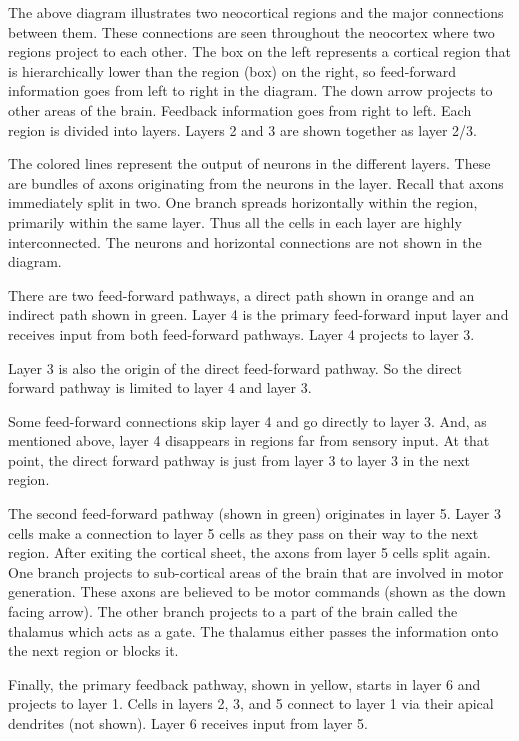 \documentclass{report}
\begin{document}
The above diagram illustrates two neocortical regions and the major
connections between them. These connections are seen throughout the
neocortex where two regions project to each other. The box on the left
represents a cortical region that is hierarchically lower than the
region (box) on the right, so feed-forward information goes from left
to right in the diagram. The down arrow projects to other areas of the
brain. Feedback information goes from right to left. Each region is
divided into layers. Layers 2 and 3 are shown together as layer 2/3.

The colored lines represent the output of neurons in the different
layers. These are bundles of axons originating from the neurons in the
layer. Recall that axons immediately split in two. One branch spreads
horizontally within the region, primarily within the same layer. Thus
all the cells in each layer are highly interconnected. The neurons and
horizontal connections are not shown in the diagram.

There are two feed-forward pathways, a direct path shown in orange and
an indirect path shown in green. Layer 4 is the primary feed-forward
input layer and receives input from both feed-forward pathways. Layer
4 projects to layer 3.

Layer 3 is also the origin of the direct feed-forward pathway. So the
direct forward pathway is limited to layer 4 and layer 3.

Some feed-forward connections skip layer 4 and go directly to layer
3. And, as mentioned above, layer 4 disappears in regions far from
sensory input. At that point, the direct forward pathway is just from
layer 3 to layer 3 in the next region.

The second feed-forward pathway (shown in green) originates in layer
5. Layer 3 cells make a connection to layer 5 cells as they pass on
their way to the next region. After exiting the cortical sheet, the
axons from layer 5 cells split again. One branch projects to
sub-cortical areas of the brain that are involved in motor
generation. These axons are believed to be motor commands (shown as
the down facing arrow). The other branch projects to a part of the
brain called the thalamus which acts as a gate. The thalamus either
passes the information onto the next region or blocks it.

Finally, the primary feedback pathway, shown in yellow, starts in
layer 6 and projects to layer 1. Cells in layers 2, 3, and 5 connect
to layer 1 via their apical dendrites (not shown). Layer 6 receives
input from layer 5.
\end{document}
